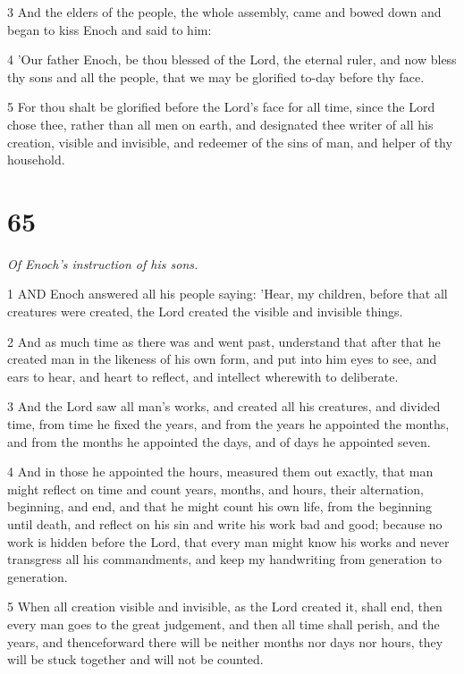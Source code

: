 \par 3 And the elders of the people, the whole assembly, came and bowed down and began to kiss Enoch and said to him:

\par 4 'Our father Enoch, be thou blessed of the Lord, the eternal ruler, and now bless thy sons and all the people, that we may be glorified to-day before thy face.

\par 5 For thou shalt be glorified before the Lord's face for all time, since the Lord chose thee, rather than all men on earth, and designated thee writer of all his creation, visible and invisible, and redeemer of the sins of man, and helper of thy household.

\chapter{65}

\par \textit{Of Enoch's instruction of his sons.}

\par 1 AND Enoch answered all his people saying: 'Hear, my children, before that all creatures were created, the Lord created the visible and invisible things.

\par 2 And as much time as there was and went past, understand that after that he created man in the likeness of his own form, and put into him eyes to see, and ears to hear, and heart to reflect, and intellect wherewith to deliberate.

\par 3 And the Lord saw all man's works, and created all his creatures, and divided time, from time he fixed the years, and from the years he appointed the months, and from the months he appointed the days, and of days he appointed seven.

\par 4 And in those he appointed the hours, measured them out exactly, that man might reflect on time and count years, months, and hours, their alternation, beginning, and end, and that he might count his own life, from the beginning until death, and reflect on his sin and write his work bad and good; because no work is hidden before the Lord, that every man might know his works and never transgress all his commandments, and keep my handwriting from generation to generation.

\par 5 When all creation visible and invisible, as the Lord created it, shall end, then every man goes to the great judgement, and then all time shall perish, and the years, and thenceforward there will be neither months nor days nor hours, they will be stuck together and will not be counted.

